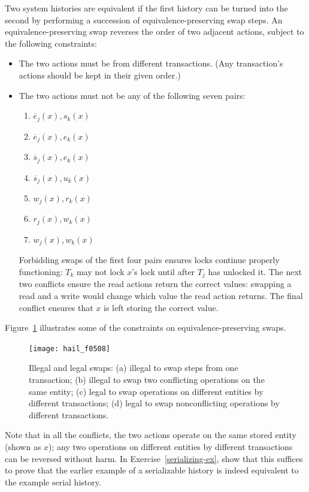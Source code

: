 Two system histories are equivalent if the first history can be turned
into the second by performing a succession of equivalence-preserving
swap steps.  An equivalence-preserving swap reverses the order of
two adjacent actions, subject to the following constraints:
\begin{itemize}
\item
The two actions must be from different transactions.  (Any
transaction's actions should be kept in their given order.)
\item
The two actions must not be any of the following seven  pairs:
\begin{enumerate}
\item
$\overline{e}_j(x), s_k(x)$
\item
$\overline{e}_j(x), e_k(x)$
\item
$\overline{s}_j(x), e_k(x)$
\item
$\overline{s}_j(x), u_k(x)$
\item
$w_j(x),r_k(x)$
\item
$r_j(x),w_k(x)$
\item
$w_j(x),w_k(x)$
\end{enumerate}
Forbidding swaps of the first four pairs ensures locks continue properly
functioning: $T_k$ may not lock $x$'s lock until after $T_j$ has
unlocked it.  The next two conflicts ensure the read actions return the correct
values: swapping a read and a write would change which value the read action returns.  The final conflict ensures that
$x$ is left storing the correct value.
\end{itemize}

Figure~\ref{scan-5-8} illustrates some of the constraints on
equivalence-preserving swaps.
\begin{figure}
\centerline{\texttt{[image: hail\_f0508]}}
\caption{Illegal and legal swaps: (a) illegal to swap steps from one
  transaction; (b) illegal to swap two conflicting operations on the
  same entity; (c) legal to swap operations on different entities by
  different transactions; (d) legal to swap nonconflicting operations by
  different transactions.}
\label{scan-5-8}
\end{figure}
Note that in all the conflicts, the two actions operate on the same
stored entity (shown as $x$); any two operations on different entities
by different transactions
can be reversed without harm.  In Exercise~\ref{serializing-ex},
show that this suffices
to prove that the earlier example of a serializable history is indeed
equivalent to the example serial history.

